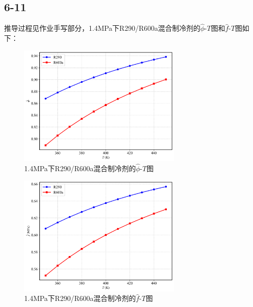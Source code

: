 \documentclass[12pt,a4paper]{article}
\begin{document}
\subsection*{6-11}

推导过程见作业手写部分，1.4MPa下R290/R600a混合制冷剂的$\hat{\phi}$-$T$图和$\hat{f}$-$T$图如下：
\begin{figure}[H]
    \centering
    \includegraphics[width=0.7\textwidth]{../chp6/figs/R290R600a_phi.png}
    \caption{1.4MPa下R290/R600a混合制冷剂的$\hat{\phi}$-$T$图}
\end{figure}

\begin{figure}[H]
    \centering
    \includegraphics[width=0.7\textwidth]{../chp6/figs/R290R600a_f.png}
    \caption{1.4MPa下R290/R600a混合制冷剂的$\hat{f}$-$T$图}
\end{figure}
\end{document}
